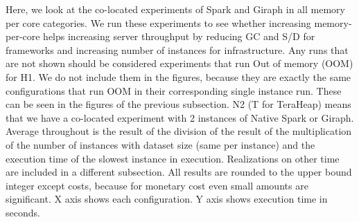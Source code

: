 Here, we look at the co-located experiments of Spark and Giraph in all memory per core categories.
We run these experiments to see whether increasing memory-per-core helps increasing server throughput by reducing GC and S/D for frameworks
and increasing number of instances for infrastructure.
Any runs that are not shown should be considered experiments that run Out of memory (OOM) for H1.
We do not include them in the figures, because they are exactly the same configurations that run OOM in their corresponding single instance run. These can be seen in the figures of the previous subsection.
N2 (T for TeraHeap) means that we have a co-located experiment with 2 instances of Native Spark or Giraph.
Average throughout is the result of the division of the result of the multiplication of the number of instances with dataset size (same per instance) and the execution time of the slowest instance in execution. Realizations on other time are included in a different subsection.
All results are rounded to the upper bound integer except costs, because for monetary cost even small amounts are significant.
X axis shows each configuration. Y axis shows execution time in seconds.
